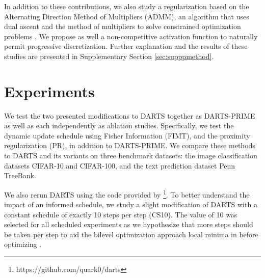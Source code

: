 \documentclass[letterpaper]{article} \usepackage{aaai22}  \usepackage{times}  \usepackage{helvet}  \usepackage{courier}  \usepackage[hyphens]{url}  \usepackage{graphicx} \urlstyle{rm} \def\UrlFont{\rm}  \usepackage{natbib}  \usepackage{caption} \DeclareCaptionStyle{ruled}{labelfont=normalfont,labelsep=colon,strut=off} \frenchspacing  \setlength{\pdfpagewidth}{8.5in}  \setlength{\pdfpageheight}{11in}  \usepackage{algorithm}
\begin{document}
In addition to these contributions, we also study a regularization based on the Alternating Direction Method of Multipliers (ADMM), an algorithm that uses dual ascent and the method of multipliers to solve constrained optimization problems \cite{boyd2010}. We propose as well a non-competitive activation function to naturally permit progressive discretization. Further explanation and the results of these studies are presented in Supplementary Section \ref{sec:supppmethod}.

\section{Experiments}
We test the two presented modifications to DARTS together as DARTS-PRIME as well as each independently as ablation studies. Specifically, we test the dynamic  update schedule using Fisher Information (FIMT), and the proximity regularization (PR), in addition to DARTS-PRIME. We compare these methods to DARTS and its variants on three benchmark datasets: the image classification datasets CIFAR-10 and CIFAR-100, and the text prediction dataset Penn TreeBank.

We also rerun DARTS using the code provided by  \cite{liu2018darts}\footnote{https://github.com/quark0/darts}. To better understand the impact of an informed schedule, we study a slight modification of DARTS with a constant schedule of exactly 10  steps per  step (CS10). The value of 10 was selected for all scheduled experiments as we hypothesize that more  steps should be taken per  step to aid the bilevel optimization approach local minima in  before optimizing .
\end{document}
